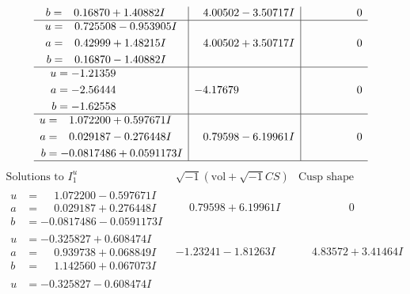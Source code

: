\documentclass[1p]{elsarticle_modified}
\theoremstyle{definition}
\newcommand{\I}{\sqrt{-1}}
\begin{document}
$$\begin{array}{c|c|c}
\begin{aligned}
b &= \phantom{-}0.16870 + 1.40882 I\end{aligned}
 & \phantom{-}4.00502 - 3.50717 I & \phantom{-0.000000 } 0 \\ \hline\begin{aligned}
u &= \phantom{-}0.725508 - 0.953905 I \\
a &= \phantom{-}0.42999 + 1.48215 I \\
b &= \phantom{-}0.16870 - 1.40882 I\end{aligned}
 & \phantom{-}4.00502 + 3.50717 I & \phantom{-0.000000 } 0 \\ \hline\begin{aligned}
u &= -1.21359\phantom{ +0.000000I} \\
a &= -2.56444\phantom{ +0.000000I} \\
b &= -1.62558\phantom{ +0.000000I}\end{aligned}
 & -4.17679\phantom{ +0.000000I} & \phantom{-0.000000 } 0 \\ \hline\begin{aligned}
u &= \phantom{-}1.072200 + 0.597671 I \\
a &= \phantom{-}0.029187 - 0.276448 I \\
b &= -0.0817486 + 0.0591173 I\end{aligned}
 & \phantom{-}0.79598 - 6.19961 I & \phantom{-0.000000 } 0\\
 \hline 
 \end{array}$$\newpage$$\begin{array}{c|c|c}  
\text{Solutions to }I^u_{1}& \I (\text{vol} + \sqrt{-1}CS) & \text{Cusp shape}\\
 \hline 
\begin{aligned}
u &= \phantom{-}1.072200 - 0.597671 I \\
a &= \phantom{-}0.029187 + 0.276448 I \\
b &= -0.0817486 - 0.0591173 I\end{aligned}
 & \phantom{-}0.79598 + 6.19961 I & \phantom{-0.000000 } 0 \\ \hline\begin{aligned}
u &= -0.325827 + 0.608474 I \\
a &= \phantom{-}0.939738 + 0.068849 I \\
b &= \phantom{-}1.142560 + 0.067073 I\end{aligned}
 & -1.23241 - 1.81263 I & \phantom{-}4.83572 + 3.41464 I \\ \hline\begin{aligned}
u &= -0.325827 - 0.608474 I \\

\end{aligned}
\end{array}$$
\end{document}
